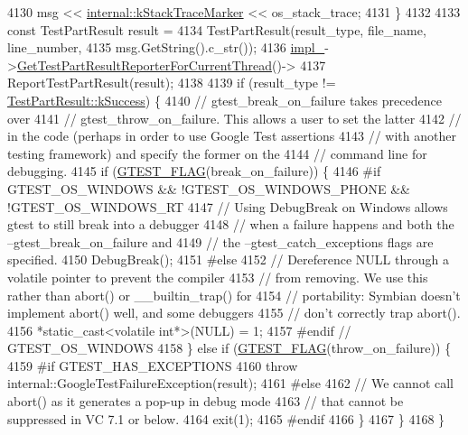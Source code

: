 \begin{DoxyCode}
4130     msg << \hyperlink{namespacetesting_1_1internal_abb38528ca6a45df265b19f5ccb3d16d9}{internal::kStackTraceMarker} << os\_stack\_trace;
4131   \}
4132 
4133   \textcolor{keyword}{const} TestPartResult result =
4134     TestPartResult(result\_type, file\_name, line\_number,
4135                    msg.GetString().c\_str());
4136   \hyperlink{classtesting_1_1UnitTest_a834685f92009d21b21a7307f4cbfb6e5}{impl\_}->\hyperlink{classtesting_1_1internal_1_1UnitTestImpl_a5fb3dd8bc839e10b62eba07790704132}{GetTestPartResultReporterForCurrentThread}()->
4137       ReportTestPartResult(result);
4138 
4139   \textcolor{keywordflow}{if} (result\_type != \hyperlink{classtesting_1_1TestPartResult_a65ae656b33fdfdfffaf34858778a52d5a8fa3d06b2baad8bf7c1f17dea314983e}{TestPartResult::kSuccess}) \{
4140     \textcolor{comment}{// gtest\_break\_on\_failure takes precedence over}
4141     \textcolor{comment}{// gtest\_throw\_on\_failure.  This allows a user to set the latter}
4142     \textcolor{comment}{// in the code (perhaps in order to use Google Test assertions}
4143     \textcolor{comment}{// with another testing framework) and specify the former on the}
4144     \textcolor{comment}{// command line for debugging.}
4145     \textcolor{keywordflow}{if} (\hyperlink{gtest-port_8h_a828f4e34a1c4b510da50ec1563e3562a}{GTEST\_FLAG}(break\_on\_failure)) \{
4146 \textcolor{preprocessor}{#if GTEST\_OS\_WINDOWS && !GTEST\_OS\_WINDOWS\_PHONE && !GTEST\_OS\_WINDOWS\_RT}
4147       \textcolor{comment}{// Using DebugBreak on Windows allows gtest to still break into a debugger}
4148       \textcolor{comment}{// when a failure happens and both the --gtest\_break\_on\_failure and}
4149       \textcolor{comment}{// the --gtest\_catch\_exceptions flags are specified.}
4150       DebugBreak();
4151 \textcolor{preprocessor}{#else}
4152       \textcolor{comment}{// Dereference NULL through a volatile pointer to prevent the compiler}
4153       \textcolor{comment}{// from removing. We use this rather than abort() or \_\_builtin\_trap() for}
4154       \textcolor{comment}{// portability: Symbian doesn't implement abort() well, and some debuggers}
4155       \textcolor{comment}{// don't correctly trap abort().}
4156       *\textcolor{keyword}{static\_cast<}\textcolor{keyword}{volatile }\textcolor{keywordtype}{int}*\textcolor{keyword}{>}(NULL) = 1;
4157 \textcolor{preprocessor}{#endif  // GTEST\_OS\_WINDOWS}
4158     \} \textcolor{keywordflow}{else} \textcolor{keywordflow}{if} (\hyperlink{gtest-port_8h_a828f4e34a1c4b510da50ec1563e3562a}{GTEST\_FLAG}(throw\_on\_failure)) \{
4159 \textcolor{preprocessor}{#if GTEST\_HAS\_EXCEPTIONS}
4160       \textcolor{keywordflow}{throw} internal::GoogleTestFailureException(result);
4161 \textcolor{preprocessor}{#else}
4162       \textcolor{comment}{// We cannot call abort() as it generates a pop-up in debug mode}
4163       \textcolor{comment}{// that cannot be suppressed in VC 7.1 or below.}
4164       exit(1);
4165 \textcolor{preprocessor}{#endif}
4166     \}
4167   \}
4168 \}
\end{DoxyCode}
